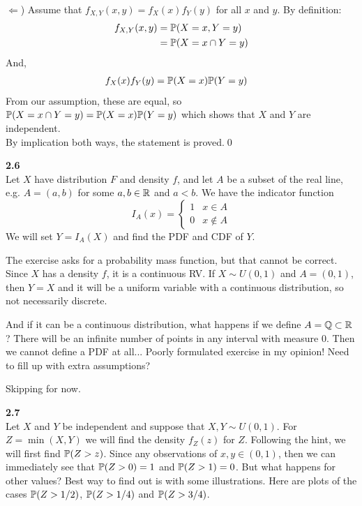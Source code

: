\medskip\noindent
$\Leftarrow$) Assume that $f_{X,Y}(x, y) = f_X(x)f_Y(y)$ for all $x$ and $y$.
By definition:
\begin{align*}
    f_{X,Y}(x, y) &= \P(X=x, Y=y) \\
    &= \P(X=x\cap Y=y)
\end{align*}
And,
\begin{align*}
    f_X(x)f_Y(y) &= \P(X=x)\P(Y=y)
\end{align*}
From our assumption, these are equal, so $\P(X=x\cap Y=y) = \P(X=x)\P(Y=y)$ which shows that
$X$ and $Y$ are independent.\\
By implication both ways, the statement is proved.\qed

\bigskip\noindent
\textbf{2.6}\\  %
Let $X$ have distribution $F$ and density $f$, and let $A$ be a subset of the
real line, e.g. $A = (a,b)$ for some $a,b\in\R$ and $a<b$. We have the indicator function
$$
I_A(x) =
\left\{
    \begin{matrix}
        1 & x\in A \\
        0 & x\not\in A
    \end{matrix}
\right.
$$
We will set $Y = I_A(X)$ and find the PDF and CDF of $Y$. 

\medskip\noindent
The exercise asks for a
probability mass function, but that cannot be correct. Since $X$ has a density $f$, it is
a continuous RV. If $X\sim U(0,1)$ and $A = (0,1)$, then $Y = X$ and it will be a uniform
variable with a continuous distribution, so not necessarily discrete.

\medskip\noindent
And if it can be a continuous distribution, what happens if we define $A = \mathbb{Q}\subset\R$?
There will be an infinite number of points in any interval with measure 0. Then we cannot define
a PDF at all... Poorly formulated exercise in my opinion! Need to fill up with 
extra assumptions? 

\medskip\noindent
Skipping for now.

\newpage\noindent
\textbf{2.7}\\  %
Let $X$ and $Y$ be independent and suppose that $X,Y\sim U(0,1)$.
For $Z = \min(X, Y)$ we will find the density $f_Z(z)$ for $Z$. Following the hint, we will first
find $\P(Z > z)$. Since any observations of $x,y\in(0,1)$, then we can immediately see that
$\P(Z > 0) = 1$ and $\P(Z > 1) = 0$. But what happens for other values? Best way to find out is
with some illustrations. Here are plots of the cases $\P(Z > 1/2)$, $\P(Z > 1/4)$ and $\P(Z > 3/4)$.

